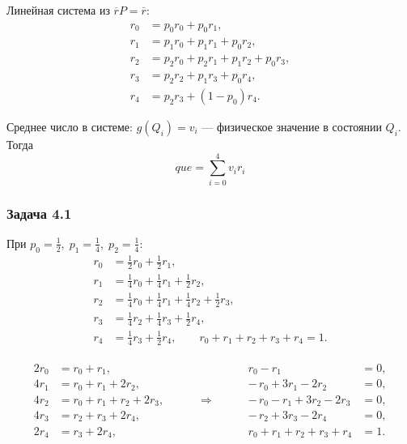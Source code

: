 Линейная система из $\overline r P=\overline r$:
\[
	\begin{aligned}
		r_0 & = p_0 r_0 + p_0 r_1,                     \\
		r_1 & = p_1 r_0 + p_1 r_1 + p_0 r_2,           \\
		r_2 & = p_2 r_0 + p_2 r_1 + p_1 r_2 + p_0 r_3, \\
		r_3 & = p_2 r_2 + p_1 r_3 + p_0 r_4,           \\
		r_4 & = p_2 r_3 + (1-p_0) r_4.
	\end{aligned}
\]

Среднее число в системе:
$g(Q_i)=v_i$ — физическое значение в состоянии $Q_i$. Тогда
$$que=\sum_{i=0}^{4} v_i r_i$$

\subsubsection*{Задача 4.1}

При $p_0=\tfrac{1}{2},\; p_1=\tfrac{1}{4},\; p_2=\tfrac{1}{4}$:
\[
	\begin{aligned}
		r_0 & = \tfrac{1}{2}r_0 + \tfrac{1}{2}r_1,                                     \\
		r_1 & = \tfrac{1}{4}r_0 + \tfrac{1}{4}r_1 + \tfrac{1}{2}r_2,                   \\
		r_2 & = \tfrac{1}{4}r_0 + \tfrac{1}{4}r_1 + \tfrac{1}{4}r_2 + \tfrac{1}{2}r_3, \\
		r_3 & = \tfrac{1}{4}r_2 + \tfrac{1}{4}r_3 + \tfrac{1}{2}r_4,                   \\
		r_4 & = \tfrac{1}{4}r_3 + \tfrac{1}{2}r_4,\qquad
		r_0+r_1+r_2+r_3+r_4=1.
	\end{aligned}
\]

\[
	\begin{array}{rcl}
		\begin{aligned}
			2r_0 & = r_0 + r_1,              \\
			4r_1 & = r_0 + r_1 + 2r_2,       \\
			4r_2 & = r_0 + r_1 + r_2 + 2r_3, \\
			4r_3 & = r_2 + r_3 + 2r_4,       \\
			2r_4 & = r_3 + 2r_4,
		\end{aligned}
		 & \qquad \Rightarrow \qquad &
		\begin{aligned}
			r_0 - r_1                  & = 0, \\
			-\,r_0 + 3r_1 - 2r_2       & = 0, \\
			-\,r_0 - r_1 + 3r_2 - 2r_3 & = 0, \\
			-\,r_2 + 3r_3 - 2r_4       & = 0, \\
			r_0+r_1+r_2+r_3+r_4        & =1.
		\end{aligned}
	\end{array}
\]

